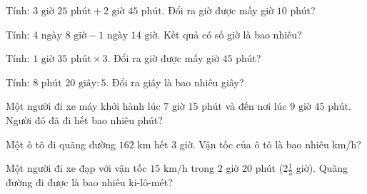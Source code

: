 
\begin{ex}
  Tính: $3\text{ giờ } 25\text{ phút} + 2\text{ giờ } 45\text{ phút}$. Đổi ra giờ được mấy giờ $10$ phút?
\end{ex}

\begin{ex}
  Tính: $4\text{ ngày } 8\text{ giờ} - 1\text{ ngày } 14\text{ giờ}$. Kết quả có số giờ là bao nhiêu?
\end{ex}

\begin{ex}
  Tính: $1\text{ giờ } 35\text{ phút} \times 3$. Đổi ra giờ được mấy giờ $45$ phút?
\end{ex}

\begin{ex}
  Tính: $8\text{ phút } 20\text{ giây} : 5$. Đổi ra giây là bao nhiêu giây?
\end{ex}

\begin{ex}
  Một người đi xe máy khởi hành lúc $7\text{ giờ } 15\text{ phút}$ và đến nơi lúc $9\text{ giờ } 45\text{ phút}$. Người đó đã đi hết bao nhiêu phút?
\end{ex}

\begin{ex}
  Một ô tô đi quãng đường $162\text{ km}$ hết $3$ giờ. Vận tốc của ô tô là bao nhiêu km/h?
\end{ex}

\begin{ex}
  Một người đi xe đạp với vận tốc $15\text{ km/h}$ trong $2$ giờ $20$ phút ($2\frac{1}{3}$ giờ). Quãng đường đi được là bao nhiêu ki-lô-mét?
\end{ex}


